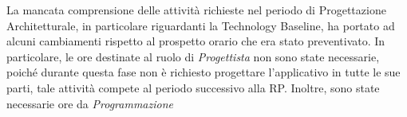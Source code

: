 La mancata comprensione delle attività richieste nel periodo di Progettazione Architetturale, in particolare riguardanti la Technology Baseline, ha portato ad alcuni cambiamenti rispetto al prospetto orario che era stato preventivato. In particolare, le ore destinate al ruolo di \textit{Progettista} non sono state necessarie, poiché durante questa fase non è richiesto progettare l'applicativo in tutte le sue parti, tale attività compete al periodo successivo alla RP. Inoltre, sono state necessarie ore da \textit{Programmazione} 